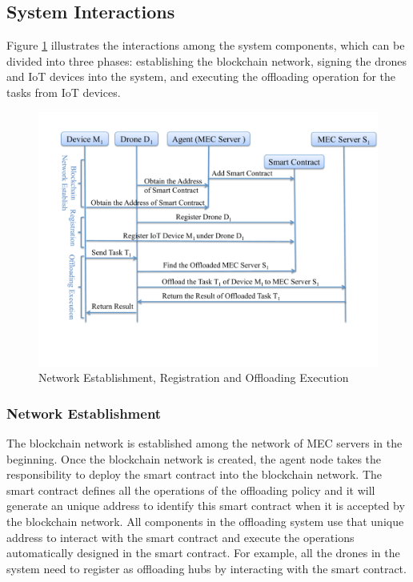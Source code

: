  
\subsection{System Interactions}
Figure \ref{fig:SmartContract} illustrates the interactions among the system components, which can be divided into three phases: establishing the blockchain network, signing the drones and IoT devices into the system, and executing the offloading operation for the tasks from IoT devices.

\begin{figure}[t]
\centering
\includegraphics[width=4.5 in]{Fig/SmartContract.pdf}
\caption{Network Establishment, Registration and Offloading Execution}
\label{fig:SmartContract}
\end{figure}

\subsubsection{Network Establishment}
 The blockchain network is established among the network of MEC servers in the beginning. 
Once the blockchain network is created, the agent node takes the responsibility to deploy the smart contract into the blockchain network. 
The smart contract defines all the operations of the offloading policy and it will generate an unique address to identify this smart contract when it is accepted by the blockchain network.
All components in the offloading system use that unique address to interact with the smart contract and execute the operations automatically designed in the smart contract.
 For example, all the drones in the system need to register as offloading hubs by interacting with the smart contract.

